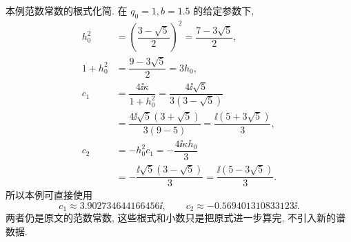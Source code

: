 \par\smallskip\noindent 本例范数常数的根式化简.\quad
在 $q_0=1,b=1.5$ 的给定参数下,
\begin{align*}
h_0^2&=\left(\dfrac{3-\sqrt{5}}{2}\right)^2
=\dfrac{7-3\sqrt{5}}{2},\\
1+h_0^2&=\dfrac{9-3\sqrt{5}}{2}=3h_0,\\
c_1&=\dfrac{4\ii\kappa}{1+h_0^2}
=\dfrac{4\ii\sqrt{5}}{3(3-\sqrt{5})}\\
&=\dfrac{4\ii\sqrt{5}(3+\sqrt{5})}{3(9-5)}
=\dfrac{\ii(5+3\sqrt{5})}{3},\\
c_2&=-h_0^2c_1
=-\dfrac{4\ii\kappa h_0}{3}\\
&=-\dfrac{\ii\sqrt{5}(3-\sqrt{5})}{3}
=\dfrac{\ii(5-3\sqrt{5})}{3}.
\end{align*}
所以本例可直接使用
\begin{equation*}
c_1\approx3.902734644166456\ii,
\qquad
c_2\approx-0.569401310833123\ii.
\end{equation*}
两者仍是原文的范数常数, 这些根式和小数只是把原式进一步算完, 不引入新的谱数据.
